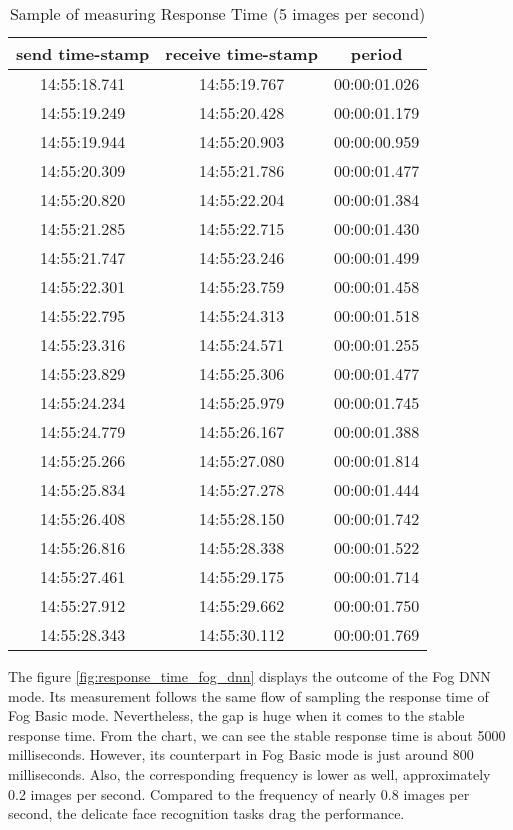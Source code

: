 \begin{table}[h!]
\centering
\begin{tabular}{ |c|c|c| } 
 \hline
 send time-stamp &    receive time-stamp &    period\\
 \hline
14:55:18.741 &    14:55:19.767 &    00:00:01.026\\
14:55:19.249 &    14:55:20.428 &    00:00:01.179\\
14:55:19.944 &    14:55:20.903 &    00:00:00.959\\
14:55:20.309 &    14:55:21.786 &    00:00:01.477\\
14:55:20.820 &    14:55:22.204 &    00:00:01.384\\
14:55:21.285 &    14:55:22.715 &    00:00:01.430\\
14:55:21.747 &    14:55:23.246 &    00:00:01.499\\
14:55:22.301 &    14:55:23.759 &    00:00:01.458\\
14:55:22.795 &    14:55:24.313 &    00:00:01.518\\
14:55:23.316 &    14:55:24.571 &    00:00:01.255\\
14:55:23.829 &    14:55:25.306 &    00:00:01.477\\
14:55:24.234 &    14:55:25.979 &    00:00:01.745\\
14:55:24.779 &    14:55:26.167 &    00:00:01.388\\
14:55:25.266 &    14:55:27.080 &    00:00:01.814\\
14:55:25.834 &    14:55:27.278 &    00:00:01.444\\
14:55:26.408 &    14:55:28.150 &    00:00:01.742\\
14:55:26.816 &    14:55:28.338 &    00:00:01.522\\
14:55:27.461 &    14:55:29.175 &    00:00:01.714\\
14:55:27.912 &    14:55:29.662 &    00:00:01.750\\
14:55:28.343 &    14:55:30.112 &    00:00:01.769\\
 \hline
\end{tabular}
\caption{Sample of measuring Response Time (5 images per second)}
\label{table:measure_response_time}
\end{table}

The figure \ref{fig:response_time_fog_dnn} displays the outcome of the Fog DNN mode. Its measurement follows the same flow of sampling the response time of Fog Basic mode. Nevertheless, the gap is huge when it comes to the stable response time. From the chart, we can see the stable response time is about 5000 milliseconds. However, its counterpart in Fog Basic mode is just around 800 milliseconds. Also, the corresponding frequency is lower as well, approximately 0.2 images per second. Compared to the frequency of nearly 0.8 images per second, the delicate face recognition tasks drag the performance.

